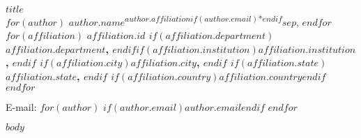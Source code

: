 \documentclass{frontiersSCNS} %
\begin{document}
\begin{flushleft}
{\Large
\textbf{$title$}
}
\\
$for(author)$
  $author.name$\textsuperscript{$author.affiliation$$if(author.email)$*$endif$}$sep$,
$endfor$
\\
$for(affiliation)$
\bf{$affiliation.id$} $if(affiliation.department)$$affiliation.department$, $endif$$if(affiliation.institution)$$affiliation.institution$, $endif$ $if(affiliation.city)$$affiliation.city$, $endif$ $if(affiliation.state)$$affiliation.state$, $endif$ $if(affiliation.country)$$affiliation.country$$endif$
\\
$endfor$

\textasteriskcentered{} E-mail: $for(author)$
  $if(author.email)$$author.email$$endif$
$endfor$

\end{flushleft}

$body$

% 
% 
\end{document}
